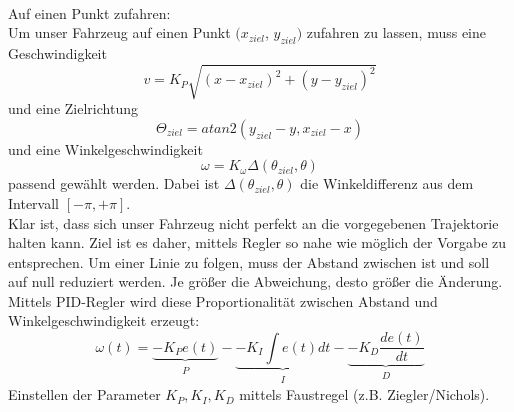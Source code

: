 \\
Auf einen Punkt zufahren: \\
Um unser Fahrzeug auf einen Punkt $(x_{ziel}$, $y_{ziel})$ zufahren zu lassen, muss eine Geschwindigkeit
\begin{equation}
v = K_{P} \sqrt{(x-x_{ziel})^2 + (y-y_{ziel})^2}
\end{equation}
und eine Zielrichtung 
\begin{equation}
\Theta_{ziel} = atan2(y_{ziel}-y, x_{ziel}-x)
\end{equation}
und eine Winkelgeschwindigkeit 
\begin{equation}
\omega = K_{\omega}\Delta(\theta_{ziel}, \theta)
\end{equation}
passend gewählt werden. Dabei ist $\Delta(\theta_{ziel}, \theta)$ die Winkeldifferenz aus dem Intervall $[-\pi , + \pi]$.\\
Klar ist, dass sich unser Fahrzeug nicht perfekt an die vorgegebenen Trajektorie halten kann. Ziel ist es daher, mittels Regler so nahe wie möglich der Vorgabe zu entsprechen. 
Um einer Linie zu folgen, muss der Abstand zwischen ist und soll auf null reduziert werden.
Je größer die Abweichung, desto größer die Änderung. Mittels PID-Regler wird diese Proportionalität zwischen Abstand und Winkelgeschwindigkeit erzeugt: 
\begin{equation}
\omega(t) = \underbrace{-K_{P}e(t)}_{\substack{P}} - \underbrace{-K_{I}\int {e(t)dt}}_{\substack{I}} - \underbrace{-K_{D}\frac{de(t)}{dt}}_{\substack{D}}
\end{equation}
Einstellen der Parameter $K_{P}, K_{I}, K_{D}$ mittels Faustregel (z.B. Ziegler/Nichols).















